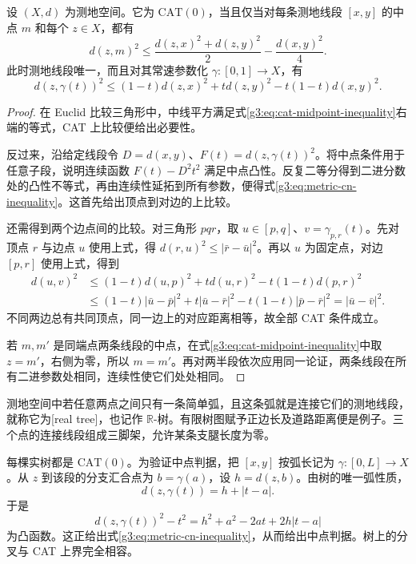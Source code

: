 \begin{proposition}\label{g3:prop:cat-zero-midpoint-criterion}
	设 \((X,d)\) 为测地空间。它为 \(\mathrm{CAT}(0)\)，当且仅当对每条测地线段 \([x,y]\) 的中点 \(m\) 和每个 \(z\in X\)，都有
	\begin{equation}\label{g3:eq:cat-midpoint-inequality}
		d(z,m)^2\le\frac{d(z,x)^2+d(z,y)^2}{2}-\frac{d(x,y)^2}{4}.
	\end{equation}
	此时测地线段唯一，而且对其常速参数化 \(\gamma:[0,1]\to X\)，有
	\begin{equation}\label{g3:eq:metric-cn-inequality}
		d(z,\gamma(t))^2\le(1-t)d(z,x)^2+td(z,y)^2-t(1-t)d(x,y)^2.
	\end{equation}
\end{proposition}
\begin{proof}
	在 Euclid 比较三角形中，中线平方满足式\eqref{g3:eq:cat-midpoint-inequality}右端的等式，CAT 上比较便给出必要性。

	反过来，沿给定线段令 \(D=d(x,y)\)、\(F(t)=d(z,\gamma(t))^2\)。将中点条件用于任意子段，说明连续函数 \(F(t)-D^2t^2\) 满足中点凸性。反复二等分得到二进分数处的凸性不等式，再由连续性延拓到所有参数，便得式\eqref{g3:eq:metric-cn-inequality}。这首先给出顶点到对边的上比较。

	还需得到两个边点间的比较。对三角形 \(pqr\)，取 \(u\in[p,q]\)、\(v=\gamma_{p,r}(t)\)。先对顶点 \(r\) 与边点 \(u\) 使用上式，得 \(d(r,u)^2\le|\bar r-\bar u|^2\)。再以 \(u\) 为固定点，对边 \([p,r]\) 使用上式，得到
	\[
	\begin{aligned}
		d(u,v)^2
		&\le(1-t)d(u,p)^2+t d(u,r)^2-t(1-t)d(p,r)^2\\
		&\le(1-t)|\bar u-\bar p|^2+t|\bar u-\bar r|^2
		-t(1-t)|\bar p-\bar r|^2
		=|\bar u-\bar v|^2.
	\end{aligned}
	\]
	不同两边总有共同顶点，同一边上的对应距离相等，故全部 CAT 条件成立。

	若 \(m,m'\) 是同端点两条线段的中点，在式\eqref{g3:eq:cat-midpoint-inequality}中取 \(z=m'\)，右侧为零，所以 \(m=m'\)。再对两半段依次应用同一论证，两条线段在所有二进参数处相同，连续性使它们处处相同。
\end{proof}

\begin{example}\label{g3:exm:real-tree-cat-zero}
	测地空间中若任意两点之间只有一条简单弧，且这条弧就是连接它们的测地线段，就称它为[real tree]，也记作 \(\mathbb R\)-树。有限树图赋予正边长及道路距离便是例子。三个点的连接线段组成三脚架，允许某条支腿长度为零。

	每棵实树都是 \(\mathrm{CAT}(0)\)。为验证中点判据，把 \([x,y]\) 按弧长记为 \(\gamma:[0,L]\to X\)。从 \(z\) 到该段的分支汇合点为 \(b=\gamma(a)\)，设 \(h=d(z,b)\)。由树的唯一弧性质，
	\[
		d(z,\gamma(t))=h+|t-a|.
	\]
	于是
	\[
		d(z,\gamma(t))^2-t^2=h^2+a^2-2at+2h|t-a|
	\]
	为凸函数。这正给出式\eqref{g3:eq:metric-cn-inequality}，从而给出中点判据。树上的分叉与 CAT 上界完全相容。
\end{example}

